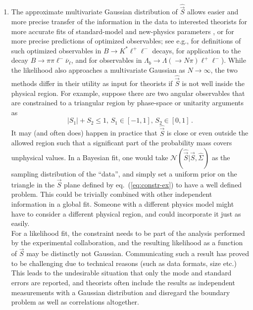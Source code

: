\documentclass[aps,nofootinbib,preprintnumbers,prd,twocolumn]{revtex4-1}
\newcommand{\refeq}[1]{eq.~(\ref{eq:#1})}
\newcommand{\vecest}[1]{\widehat{\vec{#1}}}
\newcommand{\add}[1]{\textcolor{green!85!black}{#1}}
\begin{document}
\begin{enumerate}
\item The approximate multivariate Gaussian distribution of $\vecest{S}$
    allows easier and more \add{precise} transfer of the information in the
  data to interested theorists for more accurate fits of
  standard-model and new-physics parameters \cite{Altmannshofer:2013foa,
Descotes-Genon:2013wba,Beaujean:2013soa},
  or for more precise predictions of optimized observables; see e.g.,
  \cite{Egede:2008uy,Egede:2010zc,Bobeth:2010wg,Becirevic:2011bp,
    Bobeth:2012vn,Matias:2012xw,DescotesGenon:2012zf} for definitions
  of such optimized observables in $B\to K^*\ell^+\ell^-$ decays,
  \cite{Faller:2013dwa} for application to the decay $B\to
  \pi\pi\ell^-\bar\nu_\ell$, and \cite{Boeer:2014xx} for observables
  in $\Lambda_b\to\Lambda(\to N\pi)\ell^+\ell^-$). While the
  likelihood also approaches a multivariate Gaussian as $N \to
  \infty$, the two methods differ in their utility as input for
  theorists if $\widehat{\vec{S}}$ is not well
  inside the physical region. For example, suppose there are two
  angular observables that are constrained to a triangular region by
  phase-space or unitarity arguments as
  \begin{equation}
    \label{eq:constr-ex}
    |S_1| + S_2 \le 1, \, S_1 \in [-1,1],\, S_2 \in [0,1] \,.
  \end{equation}
  It may (and often does) happen in practice that $\widehat{\vec{S}}$
  is close or even outside the allowed region such that a significant
  part of the probability mass covers unphysical values. In a Bayesian
  fit, one would take $\mathcal{N}(\vecest{S} | \vec{S},
  \widehat{\Sigma})$ as the sampling distribution of the ``data'', and
  simply set a uniform prior on the triangle in the $\vec{S}$ plane
  defined by \refeq{constr-ex} to have a well defined problem. This
  could be trivially combined with other independent information in a
  global fit. Someone with a different physics model might have to
  consider a
  different physical region, and could incorporate it just as easily.\\

  For a likelihood fit, the constraint needs to be part of the analysis
  performed by the experimental collaboration, and the resulting likelihood as
  a function of $\vec{S}$ may be distinctly not Gaussian.  Communicating such a
  result has proved to be challenging due to technical reasons (such as data
  formats, size etc.) This leads to the undesirable situation that only the
  mode and standard errors are reported, and theorists often include the
  results as independent measurements with a Gaussian distribution and
  disregard the boundary problem as well as correlations altogether.
\end{enumerate}
\end{document}
